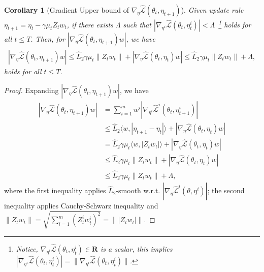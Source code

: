 \documentclass[twoside]{article} %
\theoremstyle{plain}
\newtheorem{corollary}[theorem]{Corollary}
\theoremstyle{definition}
\theoremstyle{remark}
\newcommand{\hL}{\hat{L}}
\newcommand{\fhL}{\hat{\mathcal{L}}}
\begin{document}
\begin{corollary}[Gradient Upper bound of $\nabla_{\eta}\fhL(\theta_t, \eta_{t+1})$]
    Given update rule $\eta_{t+1} = \eta_t - \gamma\mu_t Z_tw_t$, if there exists $\Lambda$ such that $|\nabla_{\eta^i}\fhL(\theta_t, \eta_{t}^i)|<\Lambda$~\footnote{Notice, $\nabla_{\eta^i}\fhL(\theta_t,\eta_t^i)\in \mathbf{R}$ is a scalar, this implies $|\nabla_{\eta^i}\fhL(\theta_t, \eta_{t}^i)|=\|\nabla_{\eta^i}\fhL(\theta_t, \eta_{t}^i)\|$.} holds for all $t\leq T$. Then, for $|\nabla_{\eta}\fhL(\theta_t, \eta_{t+1})w|$, we have
    \begin{align}
        |\nabla_{\eta} \fhL(\theta_t, \eta_{t+1})w|\leq \hL_2\gamma\mu_t\|Z_tw_t\| + |\nabla_{\eta}\fhL(\theta_t, \eta_t)w|\leq\hL_2\gamma\mu_t\|Z_tw_t\|+\Lambda,
    \end{align}
    holds for all $t\leq T$.
\end{corollary}
\begin{proof}
Expanding $|\nabla_{\eta}\fhL(\theta_t,\eta_{t+1})w|$, we have
\begin{align}
    |\nabla_{\eta} \fhL(\theta_t, \eta_{t+1})w|&=\sum_{i=1}^{m}w^i|\nabla_{\eta^i}\fhL^i(\theta_t, \eta_{t+1}^i) |\nonumber\\
    &\leq \hL_2\langle w, |\eta_{t+1}-\eta_t|\rangle + |\nabla_{\eta} \fhL(\theta_t, \eta_{t})w|\nonumber\\
    &=\hL_2\gamma\mu_t\langle w, |Z_tw_t| \rangle + |\nabla_{\eta} \fhL(\theta_t, \eta_{t})w|\nonumber\\
    &\leq \hL_2\gamma\mu_t\|Z_tw_t\| + |\nabla_{\eta}\fhL(\theta_t, \eta_t)w|\nonumber\\
    &\leq\hL_2\gamma\mu_t\|Z_tw_t\|+\Lambda,
    \label{eq: partial-smooth property}
\end{align}
where the first inequality applies $\hL_2$-smooth w.r.t. $|\nabla_{\eta}\fhL^i(\theta, \eta^i)|$; the second inequality applies Cauchy-Schwarz inequality and $\|Z_tw_t\| = \sqrt{\sum_{i=1}^{m}(Z_t^iw_t^i)^2}=\| | Z_tw_t| \|$.
\end{proof}
\end{document}
